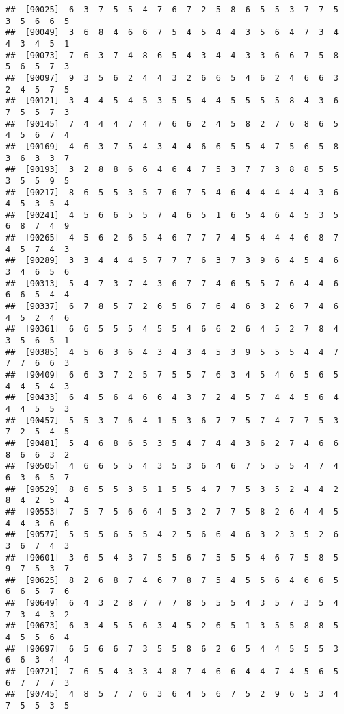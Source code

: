 \documentclass[
]{book}
\begin{document}
\begin{verbatim}
##  [90025]  6  3  7  5  5  4  7  6  7  2  5  8  6  5  5  3  7  7  5  3  5  6  6  5
##  [90049]  3  6  8  4  6  6  7  5  4  5  4  4  3  5  6  4  7  3  4  4  3  4  5  1
##  [90073]  7  6  3  7  4  8  6  5  4  3  4  4  3  3  6  6  7  5  8  5  6  5  7  3
##  [90097]  9  3  5  6  2  4  4  3  2  6  6  5  4  6  2  4  6  6  3  2  4  5  7  5
##  [90121]  3  4  4  5  4  5  3  5  5  4  4  5  5  5  5  8  4  3  6  7  5  5  7  3
##  [90145]  7  4  4  4  7  4  7  6  6  2  4  5  8  2  7  6  8  6  5  4  5  6  7  4
##  [90169]  4  6  3  7  5  4  3  4  4  6  6  5  5  4  7  5  6  5  8  3  6  3  3  7
##  [90193]  3  2  8  8  6  6  4  6  4  7  5  3  7  7  3  8  8  5  5  3  5  5  9  5
##  [90217]  8  6  5  5  3  5  7  6  7  5  4  6  4  4  4  4  4  3  6  4  5  3  5  4
##  [90241]  4  5  6  6  5  5  7  4  6  5  1  6  5  4  6  4  5  3  5  6  8  7  4  9
##  [90265]  4  5  6  2  6  5  4  6  7  7  7  4  5  4  4  4  6  8  7  4  5  7  4  3
##  [90289]  3  3  4  4  4  5  7  7  7  6  3  7  3  9  6  4  5  4  6  3  4  6  5  6
##  [90313]  5  4  7  3  7  4  3  6  7  7  4  6  5  5  7  6  4  4  6  6  6  5  4  4
##  [90337]  6  7  8  5  7  2  6  5  6  7  6  4  6  3  2  6  7  4  6  4  5  2  4  6
##  [90361]  6  6  5  5  5  4  5  5  4  6  6  2  6  4  5  2  7  8  4  3  5  6  5  1
##  [90385]  4  5  6  3  6  4  3  4  3  4  5  3  9  5  5  5  4  4  7  7  7  6  6  3
##  [90409]  6  6  3  7  2  5  7  5  5  7  6  3  4  5  4  6  5  6  5  4  4  5  4  3
##  [90433]  6  4  5  6  4  6  6  4  3  7  2  4  5  7  4  4  5  6  4  4  4  5  5  3
##  [90457]  5  5  3  7  6  4  1  5  3  6  7  7  5  7  4  7  7  5  3  7  2  5  4  5
##  [90481]  5  4  6  8  6  5  3  5  4  7  4  4  3  6  2  7  4  6  6  8  6  6  3  2
##  [90505]  4  6  6  5  5  4  3  5  3  6  4  6  7  5  5  5  4  7  4  6  3  6  5  7
##  [90529]  8  6  5  5  3  5  1  5  5  4  7  7  5  3  5  2  4  4  2  8  4  2  5  4
##  [90553]  7  5  7  5  6  6  4  5  3  2  7  7  5  8  2  6  4  4  5  4  4  3  6  6
##  [90577]  5  5  5  6  5  5  4  2  5  6  6  4  6  3  2  3  5  2  6  3  6  7  4  3
##  [90601]  3  6  5  4  3  7  5  5  6  7  5  5  5  4  6  7  5  8  5  9  7  5  3  7
##  [90625]  8  2  6  8  7  4  6  7  8  7  5  4  5  5  6  4  6  6  5  6  6  5  7  6
##  [90649]  6  4  3  2  8  7  7  7  8  5  5  5  4  3  5  7  3  5  4  7  3  4  3  2
##  [90673]  6  3  4  5  5  6  3  4  5  2  6  5  1  3  5  5  8  8  5  4  5  5  6  4
##  [90697]  6  5  6  6  7  3  5  5  8  6  2  6  5  4  4  5  5  5  3  6  6  3  4  4
##  [90721]  7  6  5  4  3  3  4  8  7  4  6  6  4  4  7  4  5  6  5  6  7  7  7  3
##  [90745]  4  8  5  7  7  6  3  6  4  5  6  7  5  2  9  6  5  3  4  7  5  5  3  5

\end{verbatim}
\end{document}
